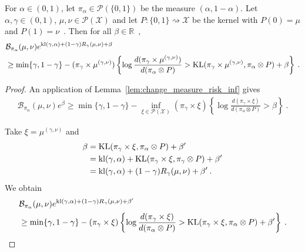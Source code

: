 \begin{lemma}
  \label{lem:change_measure_risk_mean}
  For $\alpha \in (0,1)$, let $\pi_\alpha \in \mathcal P(\{0,1\})$ be the measure $(\alpha, 1 - \alpha)$.
  Let $\alpha, \gamma \in (0,1)$, $\mu, \nu \in \mathcal P(\mathcal X)$ and let $P : \{0,1\} \rightsquigarrow \mathcal X$ be the kernel with $P(0) = \mu$ and $P(1) = \nu$~. Then for all $\beta \in \mathbb{R}$~,
  \begin{align*}
  &\mathcal B_{\pi_\alpha}(\mu, \nu) e^{\operatorname{kl}(\gamma, \alpha) + (1 - \gamma) R_\gamma(\mu, \nu) + \beta}
  \\
  &\ge \min\{\gamma, 1 - \gamma\} - (\pi_\gamma \times \mu^{(\gamma, \nu)})\left\{ \log\frac{d (\pi_\gamma \times \mu^{(\gamma, \nu)})}{d (\pi_\alpha \otimes P)} > \operatorname{KL}(\pi_\gamma \times \mu^{(\gamma, \nu)}, \pi_\alpha \otimes P) + \beta \right\}
  \: .
  \end{align*}
\end{lemma}

\begin{proof}%
{}
An application of Lemma~\ref{lem:change_measure_risk_inf} gives
\begin{align*}
\mathcal B_{\pi_\alpha}(\mu, \nu) e^{\beta}
\ge \min\{\gamma, 1 - \gamma\} - \inf_{\xi \in \mathcal P(\mathcal X)}(\pi_\gamma \times \xi)\left\{ \log\frac{d (\pi_\gamma \times \xi)}{d (\pi_\alpha \otimes P)} > \beta \right\}
\: .
\end{align*}

Take $\xi = \mu^{(\gamma, \nu)}$ and
\begin{align*}
\beta
&= \operatorname{KL}(\pi_\gamma \times \xi, \pi_\alpha \otimes P) + \beta'
\\
&= \operatorname{kl}(\gamma, \alpha) + \operatorname{KL}(\pi_\gamma \times \xi, \pi_\gamma \otimes P) + \beta'
\\
&= \operatorname{kl}(\gamma, \alpha) + (1 - \gamma) R_\gamma(\mu, \nu) + \beta'
\: .
\end{align*}
We obtain
\begin{align*}
&\mathcal B_{\pi_\alpha}(\mu, \nu) e^{\operatorname{kl}(\gamma, \alpha) + (1 - \gamma) R_\gamma(\mu, \nu) + \beta'}
\\
&\ge \min\{\gamma, 1 - \gamma\} - (\pi_\gamma \times \xi)\left\{ \log\frac{d (\pi_\gamma \times \xi)}{d (\pi_\alpha \otimes P)} > \operatorname{KL}(\pi_\gamma \times \xi, \pi_\alpha \otimes P) + \beta' \right\}
\: .
\end{align*}
\end{proof}


